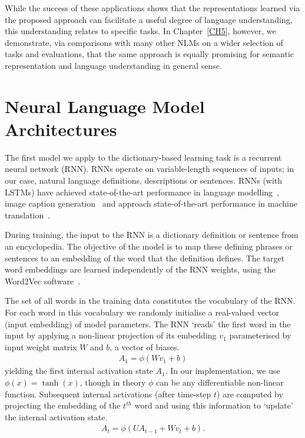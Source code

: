 While the success of these applications shows that the representations learned via the proposed approach can facilitate a useful degree of language understanding, this understanding relates to specific tasks. In Chapter~\ref{CH5}, however, we demonstrate, via comparisons with many other NLMs on a wider selection of tasks and evaluations, that the same approach is equally promising for semantic representation and language understanding in general sense. 

\section{Neural Language Model Architectures}

The first model we apply to the dictionary-based learning task is a recurrent neural network (RNN). RNNs operate on variable-length sequences of inputs; in our case, natural language definitions, descriptions or sentences. RNNs (with LSTMs) have achieved state-of-the-art performance in language modelling~\cite{mikolov2010recurrent}, image caption generation~\cite{kiros2014unifying} and approach state-of-the-art performance in machine translation~\cite{bahdanau2014neural}. 

During training, the input to the RNN is a dictionary definition or sentence from an encyclopedia. The objective of the model is to map these defining phrases or sentences to an embedding of the word that the definition defines. The target word embeddings are learned independently of the RNN weights, using the Word2Vec software~\cite{mikolov2013distributed}.   

The set of all words in the training data constitutes the vocabulary of the RNN. For each word in this vocabulary we randomly initialise a real-valued vector (input embedding) of model parameters. The RNN `reads' the first word in the input by applying a non-linear projection of its embedding \(v_1\) parameterised by input weight matrix \(W\) and \(b\), a vector of biases.
\begin{align*}
A_1 = \phi( Wv_1 + b) 
\end{align*}
yielding the first internal activation state \(A_1\). In our implementation, we
use \(\phi(x) = \tanh(x)\), though in theory \(\phi\) can be any differentiable
non-linear function. Subsequent internal activations (after time-step \(t\))
are computed by projecting the embedding of the \(t^{th}\) word and using this
information to `update' the internal activation state. 
\begin{align*}
A_t =  \phi( UA_{t-1} + Wv_t + b ). 
\end{align*}

